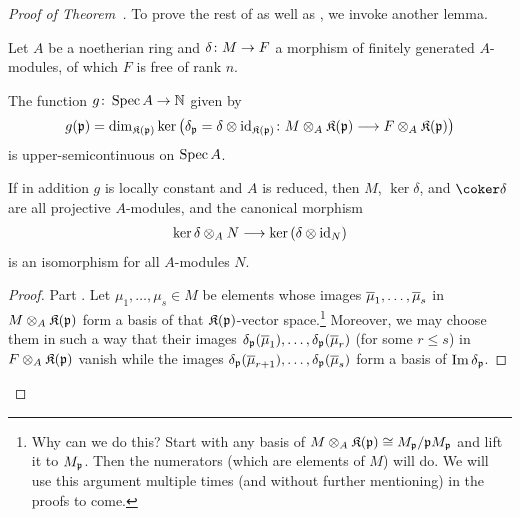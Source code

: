\documentclass[a4paper,parskip=half,numbers=enddot, DIV=12]{scrreprt}
\renewcommand{\leq}{\leqslant}
\begin{document}
\begin{proof}[Proof of Theorem~]
	To prove the rest of  as well as , we invoke another lemma.
	\begin{lem}
		Let $A$ be a noetherian ring and $\delta\colon M\morphism F$ a morphism of finitely generated $A$-modules, of which $F$ is free of rank $n$. 
		\begin{alphanumerate}
			\item The function $g\colon \Spec A\morphism\IN$ given by
			\begin{align*}
				g(\pp)=\dim_{\KK(\pp)}\ker\left(\delta_\pp=\delta\otimes\id_{\KK(\pp)}\colon M\otimes_A\KK(\pp)\morphism F\otimes_A\KK(\pp)\right)
			\end{align*}
			is upper-semicontinuous on $\operatorname{Spec} A$.
			\item If in addition $g$ is locally constant and $A$ is reduced, then $M$, $\ker\delta$, and $\coker\delta$ are all projective $A$-modules, and the canonical morphism
			\begin{align*}
				\ker\delta\otimes_AN\morphism\ker\left(\delta\otimes\id_N\right)
			\end{align*}
			is an isomorphism for all $A$-modules $N$.
		\end{alphanumerate}
	\end{lem}
	\begin{proof}
		Part . Let $\mu_1,\ldots,\mu_s\in M$ be elements whose images $\overline{\mu}_1,\ldots,\overline{\mu}_s$ in $M\otimes_A\mathfrak{K}(\mathfrak{p})$ form a basis of that $\mathfrak{K}(\mathfrak{p})$-vector space.\footnote{Why can we do this? Start with any basis of $M\otimes_A\mathfrak{K}(\mathfrak{p})\cong M_{\mathfrak{p}}/\mathfrak{p} M_{\mathfrak{p}}$ and lift it to $M_{\mathfrak{p}}$. Then the numerators (which are elements of $M$) will do. We will use this argument multiple times (and without further mentioning) in the proofs to come.} Moreover, we may choose them in such a way that their images $\delta_{\mathfrak{p}}(\overline{\mu}_1),\ldots,\delta_{\mathfrak{p}}(\overline{\mu}_r)$ (for some $r\leq s$) in $F\otimes_A\mathfrak{K}(\mathfrak{p})$ vanish while the images $\delta_{\mathfrak{p}}(\overline{\mu}_{r+1}),\ldots,\delta_{\mathfrak{p}}(\overline{\mu}_s)$ form a basis of $\operatorname{Im}\delta_{\mathfrak{p}}$. 
		

\end{proof}
\end{proof}
\end{document}
